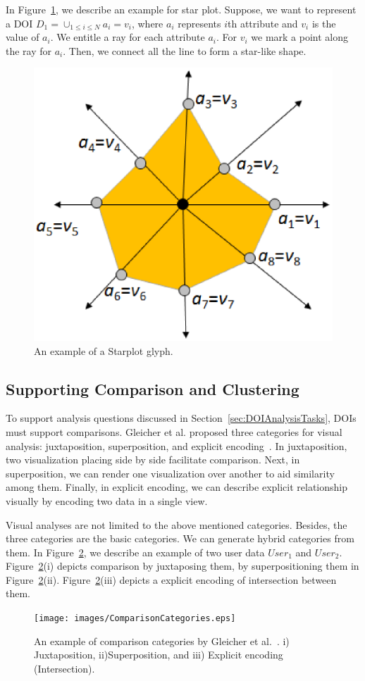 In Figure~\ref{fig:StarplotExample}, we describe an example for star plot. Suppose, we want to represent a DOI $D_1=\cup_{1 \leq i \leq N}a_i=v_i $, where $a_i$ represents $i$th attribute and $v_i$ is the value of $a_i$. We entitle a ray for each attribute $a_i$. For $v_i$ we mark a point along the ray for $a_i$. Then, we connect all the line to form a star-like shape.  
\begin{figure}[htbp]
  \centering
  \includegraphics[width=0.5\linewidth]{images/StarplotExample.eps}
  \caption{An example of a Starplot glyph. }
	\label{fig:StarplotExample}
\end{figure}

\subsection{Supporting Comparison and Clustering}
\label{sec:ComparisonSupport}
To support analysis questions discussed in Section~\ref{sec:DOIAnalysisTasks}, DOIs must support comparisons. Gleicher et al. proposed three categories for visual analysis: juxtaposition, superposition, and explicit encoding~\cite{Glei11}. In juxtaposition, two visualization placing side by side facilitate comparison. Next, in superposition, we can render one visualization over another to aid similarity among them. Finally, in explicit encoding, we can describe explicit relationship visually by encoding two data in a single view.

Visual analyses are not limited to the above mentioned categories. Besides, the three categories are the basic categories. We can generate hybrid categories from them. In Figure~\ref{fig:ComparisonCategories}, we describe an example of two user data $User_1$ and $User_2$. Figure~\ref{fig:ComparisonCategories}(i) depicts comparison by juxtaposing them, by superpositioning them in Figure~\ref{fig:ComparisonCategories}(ii). Figure~\ref{fig:ComparisonCategories}(iii) depicts a explicit encoding of intersection between them.  
\begin{figure}[htbp]
  \centering
  \texttt{[image: images/ComparisonCategories.eps]}
  \caption{An example of comparison categories by Gleicher et al.~\cite{Glei11}. i) Juxtaposition, ii)Superposition, and iii) Explicit encoding (Intersection).}
	\label{fig:ComparisonCategories}
\end{figure}

